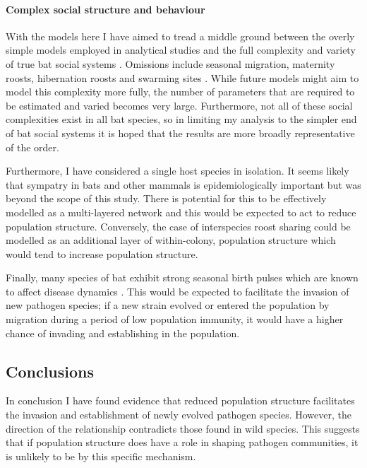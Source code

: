\paragraph{Complex social structure and behaviour}

With the models here I have aimed to tread a middle ground between the overly simple models employed in analytical studies \cite{allen2004sis} and the full complexity and variety of true bat social systems \cite{kerth2008causes}.
Omissions include seasonal migration,  maternity roosts, hibernation roosts and swarming sites \cite{kerth2008causes, fleming2003ecology, richter2008first, cryan2014continental}. 
While future models might aim to model this complexity more fully, the number of parameters that are required to be estimated and varied becomes very large.
Furthermore, not all of these social complexities exist in all bat species, so in limiting my analysis to the simpler end of bat social systems it is hoped that the results are more broadly representative of the order.

Furthermore, I have considered a single host species in isolation.
It seems likely that sympatry in bats and other mammals is epidemiologically important \cite{brierley2016quantifying, luis2013comparison, pilosof2015potential} but was beyond the scope of this study.
There is potential for this to be effectively modelled as a multi-layered network \cite{wang2016structural, funk2010interacting} and this would be expected to act to reduce population structure.
Conversely, the case of interspecies roost sharing could be modelled as an additional layer of within-colony, population structure which would tend to increase population structure.

Finally, many species of bat exhibit strong seasonal birth pulses which are known to affect disease dynamics \cite{hayman2015biannual,peel2014effect,amman2012seasonal}.
This would be expected to facilitate the invasion of new pathogen species; if a new strain evolved or entered the population by migration during a period of low population immunity, it would have a higher chance of invading and establishing in the population.

\subsection{Conclusions}

In conclusion I have found evidence that reduced population structure facilitates the invasion and establishment of newly evolved pathogen species.
However, the direction of the relationship contradicts those found in wild species.
This suggests that if population structure does have a role in shaping pathogen communities, it is unlikely to be by this specific mechanism.






